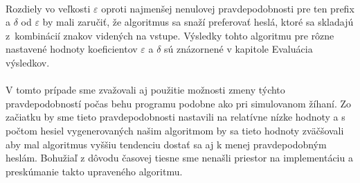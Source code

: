 \paragraph{}
Rozdiely vo veľkosti \(\varepsilon\) oproti najmenšej nenulovej pravdepodobnosti pre ten prefix a \(\delta\) od \(\varepsilon\) by mali zaručiť, že algoritmus sa snaží preferovať heslá, ktoré sa skladajú z~kombinácií znakov videných na vstupe. Výsledky tohto algoritmu pre rôzne nastavené hodnoty koeficientov \(\varepsilon\) a \(\delta\) sú znázornené v kapitole Evaluácia výsledkov.

\paragraph{}
V tomto prípade sme zvažovali aj použitie možnosti zmeny týchto pravdepodobností počas behu programu podobne ako pri simulovanom žíhaní. Zo začiatku by sme tieto pravdepodobnosti nastavili na relatívne nízke hodnoty a s počtom hesiel vygenerovaných našim algoritmom by sa tieto hodnoty zväčšovali aby mal algoritmus vyššiu tendenciu dostať sa aj k menej pravdepodobným heslám. Bohužiaľ z dôvodu časovej tiesne sme nenašli priestor na implementáciu a preskúmanie takto upraveného algoritmu.